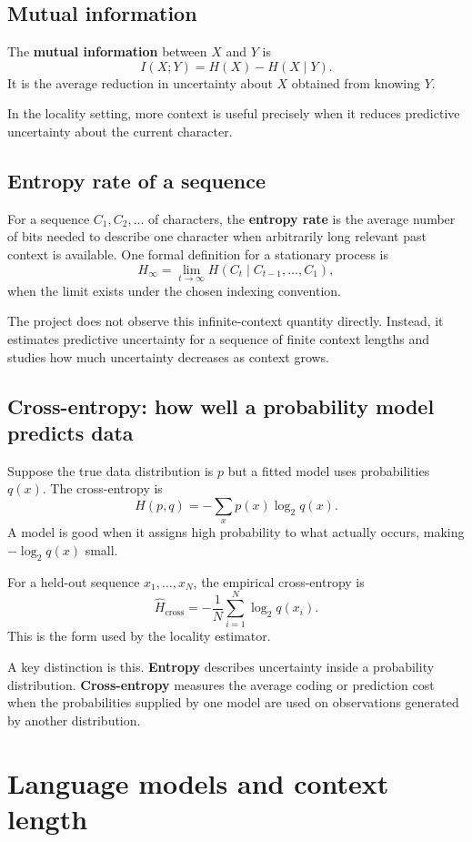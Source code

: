 \documentclass[11pt]{article}
\begin{document}
\subsection{Mutual information}
The \textbf{mutual information} between $X$ and $Y$ is
\[
I(X;Y)=H(X)-H(X\mid Y).
\]
It is the average reduction in uncertainty about $X$ obtained from knowing $Y$.

In the locality setting, more context is useful precisely when it reduces predictive uncertainty about the current character.

\subsection{Entropy rate of a sequence}
For a sequence $C_1,C_2,\ldots$ of characters, the \textbf{entropy rate} is the average number of bits needed to describe one character when arbitrarily long relevant past context is available. One formal definition for a stationary process is
\[
H_{\infty}=\lim_{t\to\infty}H(C_t\mid C_{t-1},\ldots,C_1),
\]
when the limit exists under the chosen indexing convention.

The project does not observe this infinite-context quantity directly. Instead, it estimates predictive uncertainty for a sequence of finite context lengths and studies how much uncertainty decreases as context grows.

\subsection{Cross-entropy: how well a probability model predicts data}
Suppose the true data distribution is $p$ but a fitted model uses probabilities $q(x)$. The cross-entropy is
\[
H(p,q)=-\sum_xp(x)\log_2q(x).
\]
A model is good when it assigns high probability to what actually occurs, making $-\log_2q(x)$ small.

For a held-out sequence $x_1,\ldots,x_N$, the empirical cross-entropy is
\[
\boxed{\hat H_{\mathrm{cross}}=-\frac1N\sum_{i=1}^N\log_2q(x_i).}
\]
This is the form used by the locality estimator.

A key distinction is this. \textbf{Entropy} describes uncertainty inside a probability distribution. \textbf{Cross-entropy} measures the average coding or prediction cost when the probabilities supplied by one model are used on observations generated by another distribution.

\newpage
\section{Language models and context length}
\end{document}
